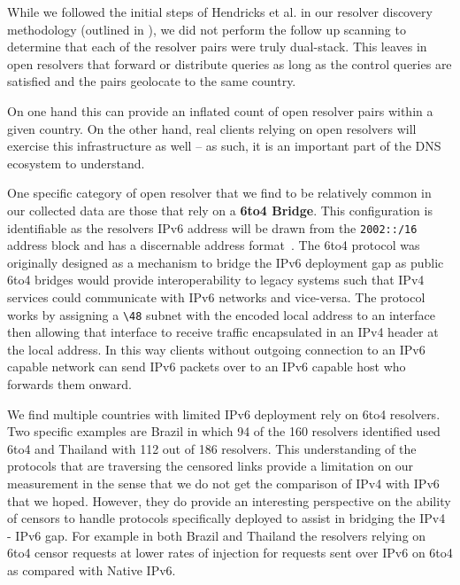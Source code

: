 While we followed the initial steps of Hendricks et al. in our resolver discovery
methodology (outlined in ), we did not perform
the follow up scanning to determine that each of the resolver pairs were truly
dual-stack. This leaves in open resolvers that forward or distribute queries as
long as the control queries are satisfied and the pairs geolocate to the
same country.

On one hand this can provide an inflated count of open resolver pairs within a
given country. On the other hand, real clients relying on open resolvers will
exercise this infrastructure as well -- as such, it is an important part of the DNS
ecosystem to understand.

One specific category of open resolver that we find to be relatively common
in our collected data are those that rely on a \textbf{6to4 Bridge}. This
configuration is identifiable as the resolvers IPv6 address will be drawn from
the \texttt{2002::/16} address
block and has a discernable address format~\cite{RFC3056}.
The 6to4 protocol was originally designed as a mechanism to bridge the IPv6
deployment gap as public 6to4 bridges would provide interoperability
to legacy systems such that IPv4 services could communicate with IPv6
networks and vice-versa. The protocol works by assigning a \texttt{\textbackslash 48} subnet
with the encoded local address to an interface then allowing that
interface to receive traffic encapsulated in an IPv4 header at the local address.
In this way clients without outgoing connection to an IPv6 capable network
can send IPv6 packets over to an IPv6 capable host who forwards them onward.

We find multiple countries with limited IPv6 deployment rely on 6to4 resolvers.
Two specific examples are Brazil in which 94 of the 160 resolvers identified used
6to4 and Thailand with 112 out of 186 resolvers. This
understanding of the protocols that are traversing the censored links provide
a limitation on our measurement in the sense that we do not get the comparison of
IPv4 with IPv6 that we hoped. However, they do provide an interesting perspective
on the ability of censors to handle protocols specifically deployed to assist in
bridging the IPv4 - IPv6 gap. For example in both Brazil and Thailand the resolvers
relying on 6to4 censor requests at lower rates of injection for requests sent over IPv6 on
6to4 as compared with Native IPv6.


